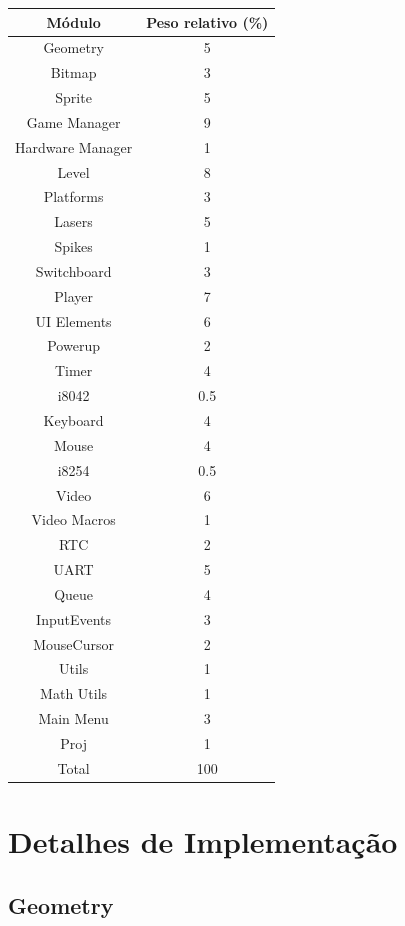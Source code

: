 \documentclass{report}
\begin{document}
\begin{center}
	\begin{tabular}{|c|c|} 
		\hline
			Módulo & Peso relativo (\%) \\
		\hline
		\hline
			Geometry & 5 \\
			Bitmap & 3 \\
			Sprite & 5 \\
			Game Manager & 9 \\
			Hardware Manager & 1 \\
			Level & 8 \\
			Platforms & 3 \\
			Lasers & 5 \\
			Spikes & 1 \\
			Switchboard & 3 \\ 
			Player & 7 \\
			UI Elements & 6 \\
			Powerup & 2 \\
			Timer & 4 \\
			i8042 & 0.5 \\
			Keyboard & 4 \\
			Mouse & 4 \\
			i8254 & 0.5 \\
			Video & 6 \\
			Video Macros & 1 \\
			RTC & 2 \\
			UART & 5 \\
			Queue & 4 \\
			InputEvents & 3 \\
			MouseCursor & 2 \\
			Utils & 1 \\
			Math Utils & 1 \\
			Main Menu & 3 \\
			Proj & 1 \\
		\hline
		\hline
			Total & 100 \\
		\hline
	\end{tabular}
\end{center}

\chapter{Detalhes de Implementação}

\section{Geometry}
\end{document}

